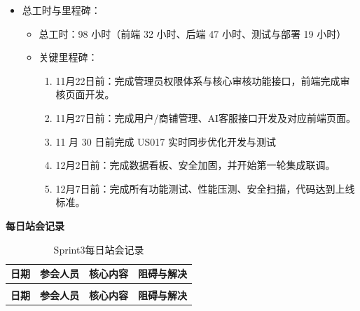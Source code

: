 \begin{levellist}
\begin{itemize}
        \item 总工时与里程碑：
              \begin{itemize}
                  \item 总工时：98 小时（前端 32 小时、后端 47 小时、测试与部署 19 小时）
                  \item 关键里程碑：
                        \begin{enumerate}
                            \item 11月22日前：完成管理员权限体系与核心审核功能接口，前端完成审核页面开发。
                            \item 11月27日前：完成用户/商铺管理、AI客服接口开发及对应前端页面。
                            \item 11 月 30 日前完成 US017 实时同步优化开发与测试
                            \item 12月2日前：完成数据看板、安全加固，并开始第一轮集成联调。
                            \item 12月7日前：完成所有功能测试、性能压测、安全扫描，代码达到上线标准。
                        \end{enumerate}

              \end{itemize}

    \end{itemize}

    \item \textbf{每日站会记录}

    \begin{longtable}{>{\centering\arraybackslash}m{1cm} >{\centering\arraybackslash}m{1cm} >{\centering\arraybackslash}m{9cm} >{\centering\arraybackslash}m{2.5cm}}

        \caption{Sprint3每日站会记录} \label{tab:training}                                                                                                                                                                          \\

        \toprule
        \textbf{日期}                                                                                    & \textbf{参会人员}                  & \textbf{核心内容}                                                      & \textbf{阻碍与解决} \\
        \midrule
        \endfirsthead

        \multicolumn{4}{c}{{\tablename\ \thetable{} 续表}}                                                                                                                                                                      \\
        \toprule
        \textbf{日期}                                                                                    & \textbf{参会人员}                  & \textbf{核心内容}                                                      & \textbf{阻碍与解决} \\
        \midrule
        \endhead


\end{longtable}
\end{levellist}
